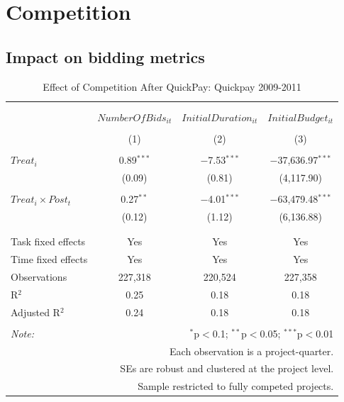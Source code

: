 \documentclass[
]{article}
\begin{document}
\hypertarget{competition}{%
\section{Competition}\label{competition}}

\hypertarget{impact-on-bidding-metrics}{%
\subsection{Impact on bidding metrics}\label{impact-on-bidding-metrics}}

\begin{table}[H] \centering 
  \caption{Effect of Competition After QuickPay: Quickpay 2009-2011} 
  \label{} 
\small 
\begin{tabular}{@{\extracolsep{0pt}}lccc} 
\\[-1.8ex]\hline 
\hline \\[-1.8ex] 
\\[-1.8ex] & $NumberOfBids_{it}$ & $InitialDuration_{it}$ & $InitialBudget_{it}$ \\ 
\\[-1.8ex] & (1) & (2) & (3)\\ 
\hline \\[-1.8ex] 
 $Treat_i$ & 0.89$^{***}$ & $-$7.53$^{***}$ & $-$37,636.97$^{***}$ \\ 
  & (0.09) & (0.81) & (4,117.90) \\ 
  & & & \\ 
 $Treat_i \times Post_t$ & 0.27$^{**}$ & $-$4.01$^{***}$ & $-$63,479.48$^{***}$ \\ 
  & (0.12) & (1.12) & (6,136.88) \\ 
  & & & \\ 
\hline \\[-1.8ex] 
Task fixed effects & Yes & Yes & Yes \\ 
Time fixed effects & Yes & Yes & Yes \\ 
Observations & 227,318 & 220,524 & 227,358 \\ 
R$^{2}$ & 0.25 & 0.18 & 0.18 \\ 
Adjusted R$^{2}$ & 0.24 & 0.18 & 0.18 \\ 
\hline 
\hline \\[-1.8ex] 
\textit{Note:}  & \multicolumn{3}{r}{$^{*}$p$<$0.1; $^{**}$p$<$0.05; $^{***}$p$<$0.01} \\ 
 & \multicolumn{3}{r}{Each observation is a project-quarter.} \\ 
 & \multicolumn{3}{r}{SEs are robust and clustered at the project level.} \\ 
 & \multicolumn{3}{r}{Sample restricted to fully competed projects.} \\ 
\end{tabular} 
\end{table}
\end{document}
